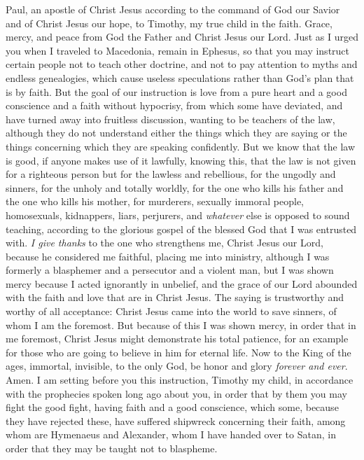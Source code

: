 
\begin{biblechapter} %
 Paul, an apostle of Christ Jesus according to the command of God our Savior and of Christ Jesus our hope,
\verse to Timothy, my true child in the faith. Grace, mercy, and peace from God the Father and Christ Jesus our Lord.
 Just as I urged you when I traveled to Macedonia, remain in Ephesus, so that you may instruct certain people not to teach other doctrine,
\verse and not to pay attention to myths and endless genealogies, which cause useless speculations rather than God’s plan that is by faith.
\verse But the goal of our instruction is love from a pure heart and a good conscience and a faith without hypocrisy,
\verse from which some have deviated, and have turned away into fruitless discussion,
\verse wanting to be teachers of the law, although they do not understand either the things which they are saying or the things concerning which they are speaking confidently.
\verse But we know that the law is good, if anyone makes use of it lawfully,
\verse knowing this, that the law is not given for a righteous person but for the lawless and rebellious, for the ungodly and sinners, for the unholy and totally worldly, for the one who kills his father and the one who kills his mother, for murderers,
\verse sexually immoral people, homosexuals, kidnappers, liars, perjurers, and \textit{whatever} else is opposed to sound teaching,
\verse according to the glorious gospel of the blessed God that I was entrusted with.
 \textit{I give thanks} to the one who strengthens me, Christ Jesus our Lord, because he considered me faithful, placing me into ministry,
\verse although I was formerly a blasphemer and a persecutor and a violent man, but I was shown mercy because I acted ignorantly in unbelief,
\verse and the grace of our Lord abounded with the faith and love that are in Christ Jesus.
\verse The saying is trustworthy and worthy of all acceptance: Christ Jesus came into the world to save sinners, of whom I am the foremost.
\verse But because of this I was shown mercy, in order that in me foremost, Christ Jesus might demonstrate his total patience, for an example for those who are going to believe in him for eternal life.
\verse Now to the King of the ages, immortal, invisible, to the only God, be honor and glory \textit{forever and ever}. Amen.
 I am setting before you this instruction, Timothy my child, in accordance with the prophecies spoken long ago about you, in order that by them you may fight the good fight,
\verse having faith and a good conscience, which some, because they have rejected these, have suffered shipwreck concerning their faith,
\verse among whom are Hymenaeus and Alexander, whom I have handed over to Satan, in order that they may be taught not to blaspheme.
\end{biblechapter}

